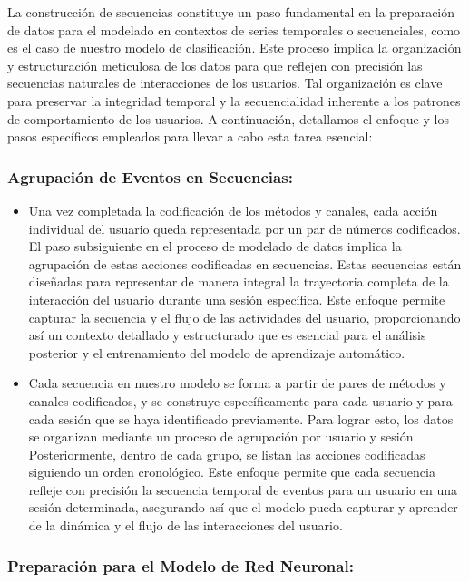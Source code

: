 La construcción de secuencias constituye un paso fundamental en la preparación de datos para el modelado en contextos de series temporales o secuenciales, como es el caso de nuestro modelo de clasificación. Este proceso implica la organización y estructuración meticulosa de los datos para que reflejen con precisión las secuencias naturales de interacciones de los usuarios. Tal organización es clave para preservar la integridad temporal y la secuencialidad inherente a los patrones de comportamiento de los usuarios. A continuación, detallamos el enfoque y los pasos específicos empleados para llevar a cabo esta tarea esencial:

\subsubsection{Agrupación de Eventos en Secuencias:}

\begin{itemize}
    \item Una vez completada la codificación de los métodos y canales, cada acción individual del usuario queda representada por un par de números codificados. El paso subsiguiente en el proceso de modelado de datos implica la agrupación de estas acciones codificadas en secuencias. Estas secuencias están diseñadas para representar de manera integral la trayectoria completa de la interacción del usuario durante una sesión específica. Este enfoque permite capturar la secuencia y el flujo de las actividades del usuario, proporcionando así un contexto detallado y estructurado que es esencial para el análisis posterior y el entrenamiento del modelo de aprendizaje automático.
    \item Cada secuencia en nuestro modelo se forma a partir de pares de métodos y canales codificados, y se construye específicamente para cada usuario y para cada sesión que se haya identificado previamente. Para lograr esto, los datos se organizan mediante un proceso de agrupación por usuario y sesión. Posteriormente, dentro de cada grupo, se listan las acciones codificadas siguiendo un orden cronológico. Este enfoque permite que cada secuencia refleje con precisión la secuencia temporal de eventos para un usuario en una sesión determinada, asegurando así que el modelo pueda capturar y aprender de la dinámica y el flujo de las interacciones del usuario.
\end{itemize}

\subsubsection{Preparación para el Modelo de Red Neuronal:}


